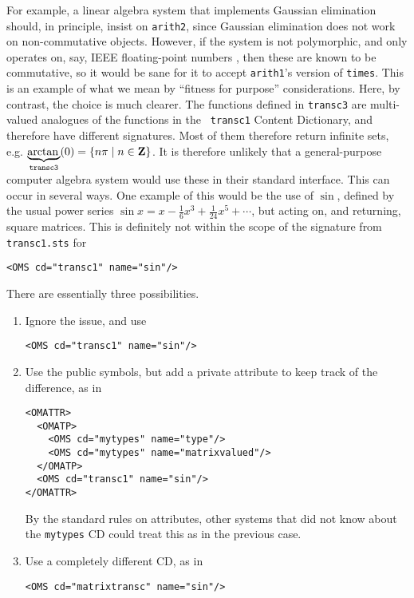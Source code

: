 \documentclass[report,keylogo]{openmath}
\begin{document}
For example, a linear algebra system that implements Gaussian elimination
should, in principle, insist on {\tt arith2}, since Gaussian elimination
does not work on non-commutative objects. However, if the system is not
polymorphic, and only operates on, say, IEEE floating-point numbers
\cite{IEEE}, then these are known to be commutative, so it would be sane
for it to accept {\tt arith1}'s version of {\tt times}. This is an example
of what we mean by ``fitness for purpose'' considerations.
\label{transc}
\def\arctanIII{\underbrace{\mathop{\rm arctan}\nolimits{}}_{\mathop{\tt
transc3}\nolimits}}
Here, by contrast, the choice is much clearer. The functions defined in
{\tt transc3} are multi-valued analogues of the functions in the {\tt
transc1} Content Dictionary, and therefore have different signatures. Most
of them therefore return infinite sets, e.g. $\arctanIII(0)=\{n\pi\mid
n\in{\bf Z}\}$. It is therefore unlikely that a general-purpose computer
algebra system would use these in their standard interface.
This can occur in several ways.
\label{matrixsin}
One example of this would be the use of $\sin$, defined by the usual power
series $\sin x = x -\frac16x^3+\frac1{24}x^5+\cdots$, but acting on, and
returning, square matrices. This is definitely not within the scope of the
signature from {\tt transc1.sts} \cite{STS} for
\begin{verbatim}
<OMS cd="transc1" name="sin"/>
\end{verbatim}
There are essentially three possibilities.
\begin{enumerate}
\item Ignore the issue, and use
\begin{verbatim}
<OMS cd="transc1" name="sin"/>
\end{verbatim}
\item Use the public symbols, but add a private attribute to keep track of
the difference, as in
\begin{verbatim}
<OMATTR>
  <OMATP>
    <OMS cd="mytypes" name="type"/>
    <OMS cd="mytypes" name="matrixvalued"/>
  </OMATP>
  <OMS cd="transc1" name="sin"/>
</OMATTR>
\end{verbatim}
By the standard rules on attributes, other systems that did not know about
the {\tt mytypes} CD could treat this as in the previous case.
\item Use a completely different CD, as in
\begin{verbatim}
<OMS cd="matrixtransc" name="sin"/>
\end{verbatim}
\end{enumerate}
\end{document}
